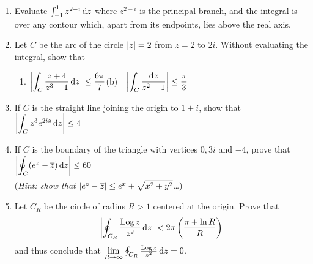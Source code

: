 \begin{exercises}
\begin{enumerate}
		
			
		\item Evaluate $\int_{-1}^1z^{2-i}\,{\mathrm{d} z}$ where $z^{2-i}$ is the principal branch, and the integral is over any contour which, apart from its endpoints, lies above the real axis.
		
			  
	  \item Let $C$ be the arc of the circle $\left| z\right|=2$ from $z=2$ to $2i$. Without evaluating the integral, show that
	  \begin{enumerate}
	  	\item $\displaystyle\left| \int_C\frac{z+4}{z^3-1}\,{\mathrm{d} z}\right|\le \frac{6\pi}7$\qquad (b)\ \ $\displaystyle\left| \int_C\frac{{\mathrm{d} z}}{z^2-1}\right|\le \frac{\pi}3$
	  \end{enumerate}
	  
	  
	  \item If $C$ is the straight line joining the origin to $1+i$, show that $\displaystyle\left| \int_C z^3e^{2iz}\,{\mathrm{d} z}\right|\le 4$
	
	
		\item If $C$ is the boundary of the triangle with vertices $0,3i$ and $-4$, prove that $\displaystyle\smash[b]{\left| \oint_C(e^z-\overline{z})\,{\mathrm{d} z}\right|}\le 60$\par
		(\emph{Hint: show that $\left| e^z-\overline{z}\right|\le e^x+\sqrt{x^2+y^2}$\ldots})
		
		
		\item Let $C_R$ be the circle of radius $R>1$ centered at the origin. Prove that 
		\[
			\left| \oint_{C_R}\frac{\operatorname{Log} z}{z^2}\,{\mathrm{d} z}\right| <2\pi\left(\frac{\pi +\ln R}R\right)
		\]
		and thus conclude that $\lim\limits_{R\to\infty}\oint_{C_R}\frac{\operatorname{Log} z}{z^2}\,{\mathrm{d} z}=0$.
		

\end{enumerate}
\end{exercises}
